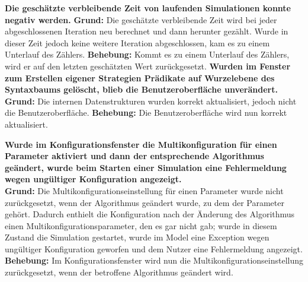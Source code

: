 \documentclass[parskip=full,11pt,openany]{scrreprt}
\begin{document}
\textbf{Die geschätzte verbleibende Zeit von laufenden Simulationen konnte negativ werden.} 
\newline
\textbf{Grund: }Die geschätzte verbleibende Zeit wird bei jeder abgeschlossenen Iteration neu berechnet und dann herunter gezählt. Wurde in dieser Zeit jedoch keine weitere Iteration abgeschlossen, kam es zu einem Unterlauf des Zählers. 
\newline
\textbf{Behebung: }Kommt es zu einem Unterlauf des Zählers, wird er auf den letzten geschätzten Wert zurückgesetzt.
\textbf{Wurden im Fenster zum Erstellen eigener Strategien Prädikate auf Wurzelebene des Syntaxbaums gelöscht, blieb die Benutzeroberfläche unverändert.} 
\newline
\textbf{Grund: } Die internen Datenstrukturen wurden  korrekt aktualisiert, jedoch nicht die Benutzeroberfläche.
\newline
\textbf{Behebung: } Die Benutzeroberfläche wird nun korrekt aktualisiert.

\textbf{Wurde im Konfigurationsfenster die Multikonfiguration für einen Parameter aktiviert und dann der entsprechende Algorithmus geändert, wurde beim Starten einer Simulation eine Fehlermeldung wegen ungültiger Konfiguration angezeigt.}\\
\textbf{Grund: } Die Multikonfigurationseinstellung für einen Parameter wurde nicht zurückgesetzt, wenn der Algorithmus geändert wurde, zu dem der Parameter gehört. Dadurch enthielt die Konfiguration nach der Änderung des Algorithmus einen Multikonfigurationsparameter, den es gar nicht gab; wurde in diesem Zustand die Simulation gestartet, wurde im Model eine Exception wegen ungültiger Konfiguration geworfen und dem Nutzer eine Fehlermeldung angezeigt.\\
\textbf{Behebung:} Im Konfigurationsfenster wird nun die Multikonfigurationseinstellung zurückgesetzt, wenn der betroffene Algorithmus geändert wird.
\end{document}
